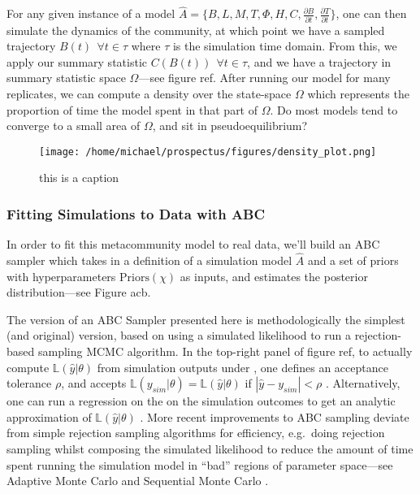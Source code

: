 \documentclass[]{article}
\begin{document}
For any given instance of a model $\hat{A} = \{B, L, M, T, \Phi, H, C, \frac{\partial B}{\partial t}, \frac{\partial T}{\partial t} \}$, one can then simulate the dynamics of the community, at which point we have a sampled trajectory $B(t) \ \ \forall t \in \tau$ where $\tau$ is the simulation time domain. From this, we apply our summary statistic $C(B(t)) \ \ \forall t \in \tau$, and we have a trajectory in summary statistic space $\Omega$---see figure ref. After running our model for many replicates, we can compute a density over the state-space $\Omega$ which represents the proportion of time the model spent in that part of $\Omega$. Do most models tend to converge to a small area of $\Omega$, and sit in pseudoequilibrium?


\begin{figure}[H]
\centering
\texttt{[image: /home/michael/prospectus/figures/density\_plot.png]}
\caption{this is a caption}
\end{figure}

\hypertarget{fitting-to-data-with-abc}{%
\subsubsection{Fitting Simulations to Data with
ABC}\label{fitting-to-data-with-abc}}

In order to fit this metacommunity model to real data, we'll build an ABC sampler which takes in a definition of a simulation model $\hat{A}$
and a set of priors with hyperparameters
$\text{Priors}(\chi)$ as inputs, and estimates the posterior distribution---see Figure acb.

The version of an ABC Sampler presented here is methodologically the
simplest (and original) version, based on using a simulated likelihood
to run a rejection-based sampling MCMC algorithm. In the
top-right panel of figure ref, to actually compute \(\mathbb{L}(\hat{y} | \theta)\) from
simulation outputs under \cite{beaumont_adaptive_2003}, one defines an acceptance tolerance
\(\rho\), and accepts $\mathbb{L}(y_{sim} | \theta) = \mathbb{L}(\hat{y} | \theta)$ if \(|\hat{y} - y_{sim}| < \rho\) . Alternatively, one
can run a regression on the on the simulation outcomes to get an
analytic approximation of \(\mathbb{L}(\hat{y} | \theta)\) \cite{whodidthis}. More recent
improvements to ABC sampling deviate from simple rejection sampling
algorithms for efficiency, e.g.~doing rejection sampling whilst
composing the simulated likelihood to reduce the amount of time spent
running the simulation model in ``bad'' regions of parameter space---see
Adaptive Monte Carlo \citep{beaumont_adaptive_2009} and Sequential
Monte Carlo \citep{cite}.
\end{document}
